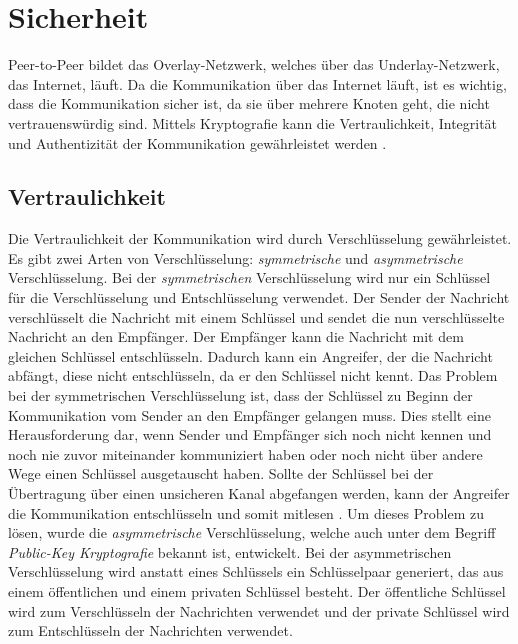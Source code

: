 \section{Sicherheit}
\label{sec:sicherheit_basics}


Peer-to-Peer bildet das Overlay-Netzwerk, welches über das Underlay-Netzwerk, das Internet, läuft. Da die Kommunikation über das Internet läuft, ist es wichtig, dass die Kommunikation sicher ist, da sie über mehrere Knoten geht, die nicht vertrauenswürdig sind. Mittels Kryptografie kann die Vertraulichkeit, Integrität und Authentizität der Kommunikation gewährleistet werden \Parencite[S. 7]{Hellmann_IT-Sicherheit}. 

\subsection{Vertraulichkeit}

Die Vertraulichkeit der Kommunikation wird durch Verschlüsselung gewährleistet. Es gibt zwei Arten von Verschlüsselung: \textit{symmetrische} und \textit{asymmetrische} Verschlüsselung. Bei der \textit{symmetrischen} Verschlüsselung wird nur ein Schlüssel für die Verschlüsselung und Entschlüsselung verwendet. Der Sender der Nachricht verschlüsselt die Nachricht mit einem Schlüssel und sendet die nun verschlüsselte Nachricht an den Empfänger. Der Empfänger kann die Nachricht mit dem gleichen Schlüssel entschlüsseln. Dadurch kann ein Angreifer, der die Nachricht abfängt, diese nicht entschlüsseln, da er den Schlüssel nicht kennt. Das Problem bei der symmetrischen Verschlüsselung ist, dass der Schlüssel zu Beginn der Kommunikation vom Sender an den Empfänger gelangen muss. Dies stellt eine Herausforderung dar, wenn Sender und Empfänger sich noch nicht kennen und noch nie zuvor miteinander kommuniziert haben oder noch nicht über andere Wege einen Schlüssel ausgetauscht haben. Sollte der Schlüssel bei der Übertragung über einen unsicheren Kanal abgefangen werden, kann der Angreifer die Kommunikation entschlüsseln und somit mitlesen \Parencites[S. 644]{DiffieHellman_NewDirectionsInCryptography}[S. 5-8]{Wong_KryptoPraxis}. Um dieses Problem zu lösen, wurde die \textit{asymmetrische} Verschlüsselung, welche auch unter dem Begriff \textit{Public-Key Kryptografie} bekannt ist, entwickelt. Bei der asymmetrischen Verschlüsselung wird anstatt eines Schlüssels ein Schlüsselpaar generiert, das aus einem öffentlichen und einem privaten Schlüssel besteht. Der öffentliche Schlüssel wird zum Verschlüsseln der Nachrichten verwendet und der private Schlüssel wird zum Entschlüsseln der Nachrichten verwendet. 

